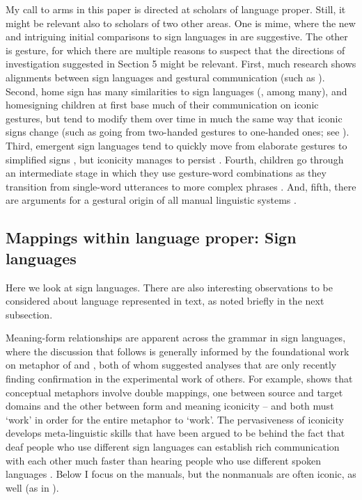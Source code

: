 \documentclass[output=paper,
modfonts
]{LSP/langsci}
\begin{document}
My call to arms in this paper is directed at scholars of language
proper. Still, it might be relevant also to scholars of two other areas.
One is mime, where the new and intriguing initial comparisons to sign
languages in \citet{sutton2013} are suggestive. The
other is gesture, for which there are multiple reasons to suspect that
the directions of investigation suggested in Section 5 might be
relevant. First, much research shows alignments between sign languages
and gestural communication (such as \citealt{hall2013}).
Second, home sign has many similarities to sign languages (\citealt{goldin2005}, among many), and homesigning children at first base much of their
communication on iconic gestures, but tend to modify them over time in
much the same way that iconic signs change (such as going from
two-handed gestures to one-handed ones; see \citealt{tomaszewski2006}). Third,
emergent sign languages tend to quickly move from elaborate gestures to
simplified signs \citep{kocab2014}, but iconicity manages
to persist \citep{hwang2016}. Fourth, children go through an
intermediate stage in which they use gesture-word combinations as they
transition from single-word utterances to more complex phrases \citep{capirci1996}. And, fifth, there are arguments for a gestural origin of
all manual linguistic systems \citep{ortega2015}.

\subsection{Mappings within language proper: Sign languages}

Here we look at sign languages. There are also interesting observations
to be considered about language represented in text, as noted briefly in
the next subsection.

Meaning-form relationships are apparent across the grammar in sign
languages, where the discussion that follows is generally informed by
the foundational work on metaphor of \citet{wilcox2000} and \citet{taub2001}, both
of whom suggested analyses that are only recently finding confirmation
in the experimental work of others. For example, \citet{meir2010} shows that
conceptual metaphors involve double mappings, one between source and
target domains and the other between form and meaning iconicity -- and
both must `work' in order for the entire metaphor to `work'. The
pervasiveness of iconicity develops meta-linguistic skills that have
been argued to be behind the fact that deaf people who use different
sign languages can establish rich communication with each other much
faster than hearing people who use different spoken languages \citep{zeshan2015}. Below I focus on the manuals, but the nonmanuals are often
iconic, as well (as in \citealt{pizzuto2008}).
\end{document}
